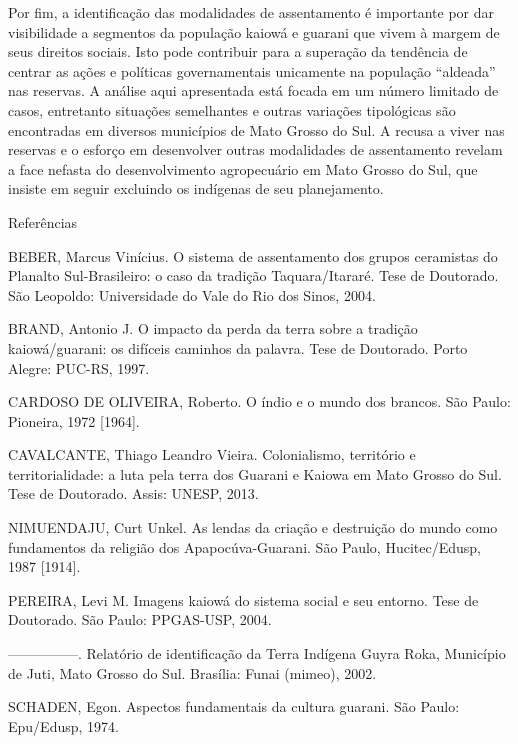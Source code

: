\documentclass{article}
\begin{document}
Por fim, a identifica\c{c}\~ao das modalidades de assentamento \'e
importante por dar visibilidade a segmentos da popula\c{c}\~ao kaiow\'a
e guarani que vivem \`a margem de seus direitos sociais. Isto pode
contribuir para a supera\c{c}\~ao da tend\^encia de centrar as
a\c{c}\~oes e pol\'iticas governamentais unicamente na popula\c{c}\~ao
{\textquotedblleft}aldeada{\textquotedblright} nas reservas. A
an\'alise aqui apresentada est\'a focada em um n\'umero limitado de
casos, entretanto situa\c{c}\~oes semelhantes e outras varia\c{c}\~oes
tipol\'ogicas s\~ao encontradas em diversos munic\'ipios de Mato Grosso
do Sul. A recusa a viver nas reservas e o esfor\c{c}o em desenvolver
outras modalidades de assentamento revelam a face nefasta do
desenvolvimento agropecu\'ario em Mato Grosso do Sul, que insiste em
seguir excluindo os ind\'igenas de seu planejamento.

Refer\^encias

BEBER, Marcus Vin\'icius. O sistema de assentamento dos grupos
ceramistas do Planalto Sul-Brasileiro: o caso da tradi\c{c}\~ao
Taquara/Itarar\'e. Tese de Doutorado. S\~ao Leopoldo: Universidade do
Vale do Rio dos Sinos, 2004.

BRAND, Antonio J. O impacto da perda da terra sobre a tradi\c{c}\~ao
kaiow\'a/guarani: os dif\'iceis caminhos da palavra. Tese de Doutorado.
Porto Alegre: PUC-RS, 1997.

CARDOSO DE OLIVEIRA, Roberto. O \'indio e o mundo dos brancos. S\~ao
Paulo: Pioneira, 1972 [1964].

CAVALCANTE, Thiago Leandro Vieira. Colonialismo, territ\'orio e
territorialidade: a luta pela terra dos Guarani e Kaiowa em Mato Grosso
do Sul. Tese de Doutorado. Assis: UNESP, 2013.

NIMUENDAJU, Curt Unkel. As lendas da cria\c{c}\~ao e destrui\c{c}\~ao do
mundo como fundamentos da religi\~ao dos Apapoc\'uva-Guarani. S\~ao
Paulo, Hucitec/Edusp, 1987 [1914].

PEREIRA, Levi M. Imagens kaiow\'a do sistema social e seu entorno. Tese
de Doutorado. S\~ao Paulo: PPGAS-USP, 2004.

{}---{}---{}---{}---{}---. Relat\'orio de identifica\c{c}\~ao da Terra
Ind\'igena Guyra Roka, Munic\'ipio de Juti, Mato Grosso do Sul.
Bras\'ilia: Funai (mimeo), 2002.

SCHADEN, Egon. Aspectos fundamentais da cultura guarani. S\~ao Paulo:
Epu/Edusp, 1974.
\end{document}
